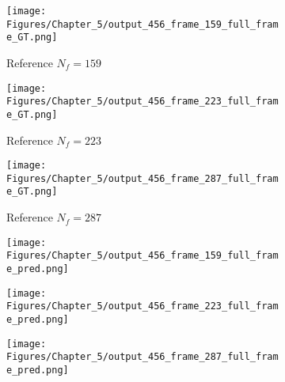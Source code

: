 \begin{figure} [!ht]
	\centering
	\begin{subfigure}[b]{.32\textwidth}
		\centering
		\texttt{[image: Figures/Chapter\_5/output\_456\_frame\_159\_full\_frame\_GT.png]}
		\caption{Reference $N_f=159$}
		\label{fig:ref_456_full_159}
	\end{subfigure}
	\hfill
	\begin{subfigure}[b]{.32\textwidth}
		\centering
		\texttt{[image: Figures/Chapter\_5/output\_456\_frame\_223\_full\_frame\_GT.png]}
		\caption{Reference $N_f=223$}
		\label{fig:ref_456_full_223}
	\end{subfigure}
	\hfill
	\begin{subfigure}[b]{.32\textwidth}
		\centering
		\texttt{[image: Figures/Chapter\_5/output\_456\_frame\_287\_full\_frame\_GT.png]}
		\caption{Reference $N_f=287$}
		\label{fig:ref_456_full_287}	
	\end{subfigure}
	\hfill
	\begin{subfigure}[b]{.32\textwidth}
		\centering
		\texttt{[image: Figures/Chapter\_5/output\_456\_frame\_159\_full\_frame\_pred.png]}
		\caption{}
		\label{fig:pred_456_full_159}
	\end{subfigure}
	\hfill
	\begin{subfigure}[b]{.32\textwidth}
		\centering
		\texttt{[image: Figures/Chapter\_5/output\_456\_frame\_223\_full\_frame\_pred.png]}
		\caption{}
		\label{fig:pred_456_full_223}
	\end{subfigure}
	\hfill
	\begin{subfigure}[b]{.32\textwidth}
		\centering
		\texttt{[image: Figures/Chapter\_5/output\_456\_frame\_287\_full\_frame\_pred.png]}
		\caption{}
		\label{fig:pred_456_full_287}	
	\end{subfigure}
	\caption{}
	\label{fig:num_results_CS_456}
\end{figure}

